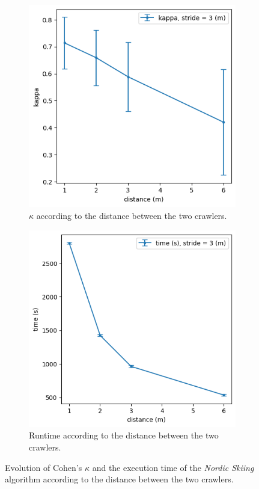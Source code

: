 \begin{figure}[h!]
	\begin{subfigure}[t]{0.49\linewidth}
		\includegraphics[width=\linewidth]{graphics/ski_nordique-kappa_vs_distance.png}
		\caption{$\kappa$ according to the distance between the two crawlers.}
		\label{fig:ski_nordique-kappa_vs_distance}
	\end{subfigure}
	\hfill
	\begin{subfigure}[t]{0.49\linewidth}
		\includegraphics[width=\linewidth]{graphics/ski_nordique-time_vs_distance.png}
		\caption{Runtime according to the distance between the two crawlers.}
		\label{fig:ski_nordique-time_vs_distance}
	\end{subfigure}
	\caption{Evolution of Cohen's $\kappa$ and the execution time of the \textit{Nordic Skiing} algorithm according to the distance between the two crawlers.}
	\label{fig:ski_nordique-distance}
\end{figure}

